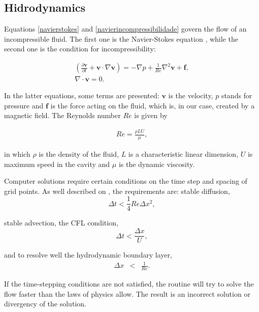 \documentclass[journal]{IEEEtran}
\begin{document}
\subsection{Hidrodynamics}
Equations \ref{navierstokes} and \ref{navierincompressibilidade} govern the flow of an incompressible fluid. The first one is the Navier-Stokes equation \cite{batchelor}, while the second one is the condition for incompressibility:

\begin{eqnarray}
\left( \frac{\partial {\textbf{v}}}{\partial t}+\textbf{v}\cdot\nabla \textbf{v} \right)=-\nabla p+\frac{1}{\mathit{Re}}\nabla^2 \textbf{v} + \textbf{f}\label{navierstokes},\\
\nabla\cdot\textbf{v}=0.\label{navierincompressibilidade}
\end{eqnarray}

In the latter equations, some terms are presented: $\mathbf{v}$ is the velocity, $p$ stands for pressure and $\mathbf{f}$ is the force acting on the fluid, which is, in our case, created by a magnetic field. The Reynolds number $\mathit{Re}$ is given by 

\begin{eqnarray}
\mathit{Re}=\frac{\rho L U}{\mu},
\end{eqnarray}

in which $\rho$ is the density of the fluid, $L$ is a characteristic linear dimension, $U$ is maximum speed in the cavity and $\mu$ is the dynamic viscosity.

Computer solutions require certain conditions on the time step and spacing of grid points. As well described on \cite{hinchLectureNotes}, the requirements are: stable diffusion, 
\begin{equation}
\Delta t < \frac{1}{4}\mathit{Re}\Delta x^2, \label{stablediffusion}
\end{equation} 

stable advection, the CFL condition,
\begin{equation}
\Delta t < \frac{\Delta x}{U}, \label{stableadvection}
\end{equation}

 and to resolve well the hydrodynamic boundary layer,  
 \begin{eqnarray}
\Delta x &<& \frac{1}{\mathit{Re}}. \label{boundarylayer}
\end{eqnarray} 

If the time-stepping conditions are not satisfied, the routine will try to solve the flow faster than the laws of physics allow. The result is an incorrect solution or divergency of the solution.
\end{document}
